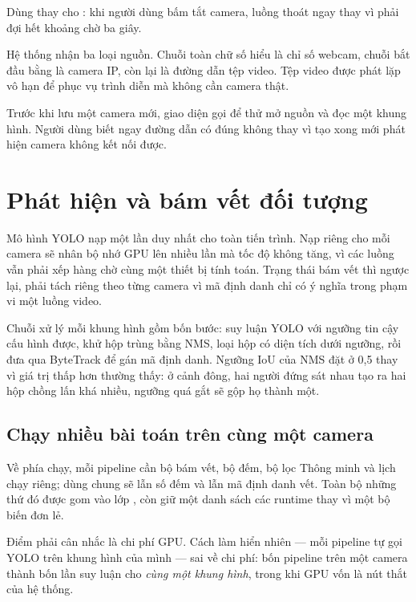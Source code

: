 Dùng  thay cho  : khi người dùng bấm tắt camera, luồng thoát ngay thay vì phải đợi hết
khoảng chờ ba giây.

Hệ thống nhận ba loại nguồn. Chuỗi toàn chữ số hiểu là chỉ số webcam, chuỗi bắt
đầu bằng  là camera IP, còn lại là đường dẫn tệp video. Tệp video
được phát lặp vô hạn để phục vụ trình diễn mà không cần camera thật.

Trước khi lưu một camera mới, giao diện gọi  để thử
mở nguồn và đọc một khung hình. Người dùng biết ngay đường dẫn có đúng không thay
vì tạo xong mới phát hiện camera không kết nối được.

\section{Phát hiện và bám vết đối tượng}
\label{sec:phathien}

Mô hình YOLO nạp một lần duy nhất cho toàn tiến trình. Nạp riêng cho mỗi camera
sẽ nhân bộ nhớ GPU lên nhiều lần mà tốc độ không tăng, vì các luồng vẫn phải xếp
hàng chờ cùng một thiết bị tính toán. Trạng thái bám vết thì ngược lại, phải tách
riêng theo từng camera vì mã định danh chỉ có ý nghĩa trong phạm vi một luồng
video.

Chuỗi xử lý mỗi khung hình gồm bốn bước: suy luận YOLO với ngưỡng tin cậy cấu
hình được, khử hộp trùng bằng NMS, loại hộp có diện tích dưới ngưỡng, rồi đưa qua
ByteTrack để gán mã định danh. Ngưỡng IoU của NMS đặt ở 0{,}5 thay vì giá trị
thấp hơn thường thấy: ở cảnh đông, hai người đứng sát nhau tạo ra hai hộp chồng
lấn khá nhiều, ngưỡng quá gắt sẽ gộp họ thành một.

\subsection{Chạy nhiều bài toán trên cùng một camera}
\label{sec:chungphathien}


Về phía chạy, mỗi pipeline cần bộ bám vết, bộ đếm, bộ lọc Thông minh và lịch chạy
riêng; dùng chung sẽ lẫn số đếm và lẫn mã định danh vết. Toàn bộ những thứ đó được gom
vào lớp , còn  giữ một danh sách các runtime
thay vì một bộ biến đơn lẻ.

Điểm phải cân nhắc là chi phí GPU. Cách làm hiển nhiên --- mỗi pipeline tự gọi YOLO
trên khung hình của mình --- sai về chi phí: bốn pipeline trên một camera thành bốn lần
suy luận cho \emph{cùng một khung hình}, trong khi GPU vốn là nút thắt của hệ thống.

